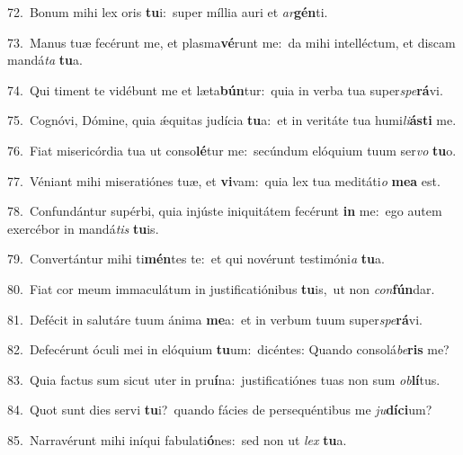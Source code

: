 {\numbfont\textcolor{\numbcolor}{72.}}~Bonum mihi lex oris \textbf{tu}\-i:~\star super míllia auri et \textit{ar}\-\textbf{gén}ti.\par
{\numbfont\textcolor{\numbcolor}{73.}}~Manus tuæ fecérunt me, et plasma\-\textbf{vé}\-runt me:~\star da mihi intelléctum, et discam mandá\textit{ta} \textbf{tu}\-a.\par
{\numbfont\textcolor{\numbcolor}{74.}}~Qui timent te vidébunt me et læta\-\textbf{bún}\-tur:~\star quia in verba tua super\-\textit{spe}\-\textbf{rá}vi.\par
{\numbfont\textcolor{\numbcolor}{75.}}~Cognóvi, Dómine, quia ǽquitas judícia \textbf{tu}\-a:~\star et in veritáte tua humi\-\textit{li}\-\textbf{ás}\textbf{ti} me.\par
{\numbfont\textcolor{\numbcolor}{76.}}~Fiat misericórdia tua ut conso\-\textbf{lé}\-tur me:~\star secúndum elóquium tuum ser\textit{vo} \textbf{tu}\-o.\par
{\numbfont\textcolor{\numbcolor}{77.}}~Véniant mihi miseratiónes tuæ, et \textbf{vi}\-vam:~\star quia lex tua meditáti\textit{o} \textbf{me}\-\textbf{a} est.\par
{\numbfont\textcolor{\numbcolor}{78.}}~Confundántur supérbi, quia injúste iniquitátem fecérunt \textbf{in} me:~\star ego autem exercébor in mandá\textit{tis} \textbf{tu}\-is.\par
{\numbfont\textcolor{\numbcolor}{79.}}~Convertántur mihi ti\-\textbf{mén}\-tes te:~\star et qui novérunt testimóni\textit{a} \textbf{tu}\-a.\par
{\numbfont\textcolor{\numbcolor}{80.}}~Fiat cor meum immaculátum in justificatiónibus \textbf{tu}\-is,~\star ut non \textit{con}\-\textbf{fún}dar.\par
{\numbfont\textcolor{\numbcolor}{81.}}~Defécit in salutáre tuum ánima \textbf{me}\-a:~\star et in verbum tuum super\-\textit{spe}\-\textbf{rá}vi.\par
{\numbfont\textcolor{\numbcolor}{82.}}~Defecérunt óculi mei in elóquium \textbf{tu}\-um:~\star dicéntes: Quando consolá\-\textit{be}\-\textbf{ris} me?\par
{\numbfont\textcolor{\numbcolor}{83.}}~Quia factus sum sicut uter in pru\-\textbf{í}\-na:~\star justificatiónes tuas non sum \textit{ob}\-\textbf{lí}tus.\par
{\numbfont\textcolor{\numbcolor}{84.}}~Quot sunt dies servi \textbf{tu}\-i?~\star quando fácies de persequéntibus me \textit{ju}\-\textbf{dí}\textbf{ci}um?\par
{\numbfont\textcolor{\numbcolor}{85.}}~Narravérunt mihi iníqui fabulati\-\textbf{ó}\-nes:~\star sed non ut \textit{lex} \textbf{tu}\-a.\par

